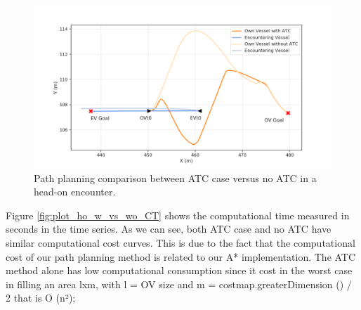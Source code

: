 
        \begin{figure}[H]
            \centering
            \includegraphics[scale=0.5]{figs/Chap5/plot_ho_w_vs_wo.png}
            \caption{Path planning comparison between ATC case versus no ATC in a head-on encounter.}
            \label{fig:plot_ho_w_vs_wo}
        \end{figure}
        
        Figure \ref{fig:plot_ho_w_vs_wo_CT} shows the computational time measured in seconds in the time series. As we can see, both ATC case and no ATC have similar computational cost curves. This is due to the fact that the computational cost of our path planning method is related to our A* implementation. The ATC method alone has low computational consumption since it cost in the worst case in filling an area lxm, with l = OV size and m = costmap.greaterDimension () / 2 that is O (n²);
        
